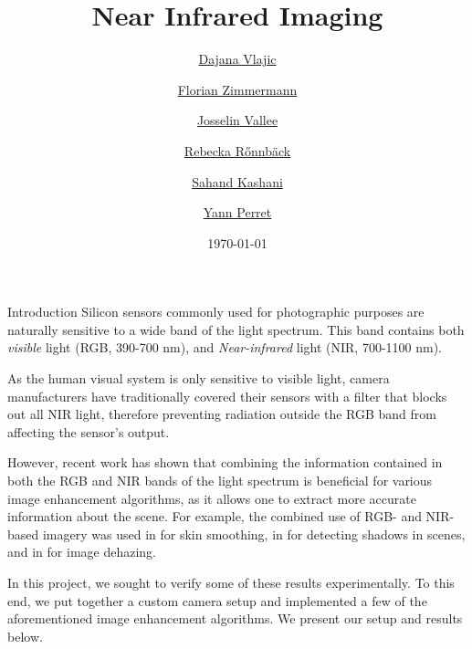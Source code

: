 \documentclass[10pt]{article}
\title{Near Infrared Imaging}
\author{
    \href{mailto:dajana.vlajic@epfl.ch}{Dajana Vlajic} \and
    \href{mailto:florian.zimmermann@epfl.ch}{Florian Zimmermann} \and
    \href{mailto:josselin.vallee@epfl.ch}{Josselin Vallee} \and
    \href{mailto:rebecka.ronnback@epfl.ch}{Rebecka R{\H o}nnb{\"a}ck} \and
    \href{mailto:sahand.kashani-akhavan@epfl.ch}{Sahand Kashani} \and
    \href{mailto:yann.perret@epfl.ch}{Yann Perret}
}
\date{\today}
\begin{document}
\maketitle

\begin{section}{Introduction}
    \label{sec:introduction}
    Silicon sensors commonly used for photographic purposes are naturally sensitive to a wide band of the light spectrum. This band contains both \emph{visible} light (RGB, 390-700 nm), and \emph{Near-infrared} light (NIR, 700-1100 nm).

    \medskip

    As the human visual system is only sensitive to visible light, camera manufacturers have traditionally covered their sensors with a filter that blocks out all NIR light, therefore preventing radiation outside the RGB band from affecting the sensor's output.

    \medskip

    However, recent work has shown that combining the information contained in both the RGB and NIR bands of the light spectrum is beneficial for various image enhancement algorithms, as it allows one to extract more accurate information about the scene. For example, the combined use of RGB- and NIR-based imagery was used in \cite{skin} for skin smoothing, in \cite{shadow} for detecting shadows in scenes, and in \cite{dehazing} for image dehazing.

    \medskip

    In this project, we sought to verify some of these results experimentally. To this end, we put together a custom camera setup and implemented a few of the aforementioned image enhancement algorithms. We present our setup and results below.

\end{section}
\end{document}
